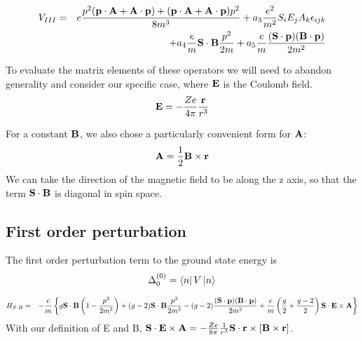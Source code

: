 \begin{eqnarray*}
 V_{III} &=& 
		e\frac{p^2 ( \mathbf{p} \cdot \mathbf{A} + \mathbf{A} \cdot \mathbf{p}) + (\mathbf{p} \cdot \mathbf{A} + \mathbf{A} \cdot \mathbf{p})p^2}{8m^3}
		+  a_3 \frac{e^2}{m^2} S_i  E_j A_k \epsilon_{ijk}	\\
	&&	+ a_4 \frac{e}{m} \mathbf{S} \cdot \mathbf{B} \frac{p^2}{2m} 
		+ a_5 \frac{e}{m} \frac{ (\mathbf{S} \cdot \mathbf{p}) (\mathbf{B} \cdot \mathbf{p})}{2m^2}
\end{eqnarray*}


To evaluate the matrix elements of these operators we will need to abandon generality and consider our specific case, where $\mathbf{E}$ is the Coulomb field. 
\[	\mathbf{E} = -\frac{Ze}{4\pi} \frac{\mathbf{r}}{r^3}	\]

For a constant $\mathbf{B}$, we also chose a particularly convenient form for $\mathbf{A}$:
\[	\mathbf{A} = \frac{1}{2}\mathbf{B} \times \mathbf{r}		\]
We can take the direction of the magnetic field to be along the z axis, so that the term $\mathbf{S} \cdot \mathbf{B}$ is diagonal in spin space.

\subsection*{First order perturbation}
The first order perturbation term to the ground state energy is
\[	\Delta^{(0)}_0 = \matrixel{n}{V}{n}	\]


\begin{eqnarray*}  
H_{S \cdot B} &=& - \frac{e}{m} \left\{
				g \mathbf{S} \cdot \mathbf{B} \left ( 1 - \frac{p^2}{2m^2} \right )
				+ (g-2) \mathbf{S} \cdot \mathbf{B} \frac{p^2}{2m^2}
				- (g-2) \frac{ (\mathbf{S} \cdot \mathbf{p}) (\mathbf{B} \cdot \mathbf{p})}{2m^2}
				+ \frac{e}{m} \left(\frac{g}{2} + \frac{g-2}{2} \right)  \mathbf{S} \cdot \mathbf{E} \times \mathbf{A}
			\right\}	
\end{eqnarray*}
With our definition of E and B, $\mathbf{S} \cdot \mathbf{E} \times \mathbf{A} = - \frac{Ze}{8\pi} \frac{1}{r^3} \mathbf{S} \cdot \mathbf{r} \times [\mathbf{B} \times \mathbf{r}]$.


